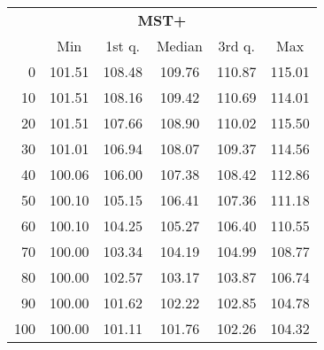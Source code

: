 \begin{tabular}{r|ccccc}
  \multicolumn{6}{c}{{\bf MST+}} \\
  & Min & 1st q. & Median & 3rd q. & Max \\ \hline\hline
  0 & 101.51 & 108.48 & 109.76 & 110.87 & 115.01
\\ 10 & 101.51 & 108.16 & 109.42 & 110.69 & 114.01
\\ 20 & 101.51 & 107.66 & 108.90 & 110.02 & 115.50
\\ 30 & 101.01 & 106.94 & 108.07 & 109.37 & 114.56
\\ 40 & 100.06 & 106.00 & 107.38 & 108.42 & 112.86
\\ 50 & 100.10 & 105.15 & 106.41 & 107.36 & 111.18
\\ 60 & 100.10 & 104.25 & 105.27 & 106.40 & 110.55
\\ 70 & 100.00 & 103.34 & 104.19 & 104.99 & 108.77
\\ 80 & 100.00 & 102.57 & 103.17 & 103.87 & 106.74
\\ 90 & 100.00 & 101.62 & 102.22 & 102.85 & 104.78
\\ 100 & 100.00 & 101.11 & 101.76 & 102.26 & 104.32
\end{tabular}
